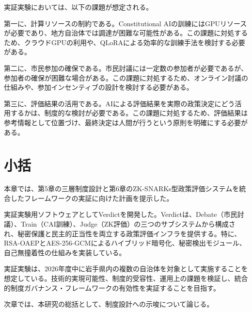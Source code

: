 実証実験においては、以下の課題が想定される。

第一に、計算リソースの制約である。Constitutional AIの訓練にはGPUリソースが必要であり、地方自治体では調達が困難な可能性がある。この課題に対処するため、クラウドGPUの利用や、QLoRAによる効率的な訓練手法を検討する必要がある。

第二に、市民参加の確保である。市民討議には一定数の参加者が必要であるが、参加者の確保が困難な場合がある。この課題に対処するため、オンライン討議の仕組みや、参加インセンティブの設計を検討する必要がある。

第三に、評価結果の活用である。AIによる評価結果を実際の政策決定にどう活用するかは、制度的な検討が必要である。この課題に対処するため、評価結果は参考情報として位置づけ、最終決定は人間が行うという原則を明確にする必要がある。

\section{小括}
\label{sec:ch_integrated_summary}

本章では、第5章の三層制度設計と第6章のZK-SNARKs型政策評価システムを統合したフレームワークの実証に向けた計画を提示した。

実証実験用ソフトウェアとしてVerdictを開発した。Verdictは、Debate（市民討議）、Train（CAI訓練）、Judge（ZK評価）の三つのサブシステムから構成され、秘密保護と民主的正当性を両立する政策評価インフラを提供する。特に、RSA-OAEPとAES-256-GCMによるハイブリッド暗号化、秘密検出モジュール、自己無撞着性の仕組みを実装している。

実証実験は、2026年度中に岩手県内の複数の自治体を対象として実施することを想定している。技術的実現可能性、制度的受容性、運用上の課題を検証し、統合的制度ガバナンス・フレームワークの有効性を実証することを目指す。

次章では、本研究の総括として、制度設計への示唆について論じる。

